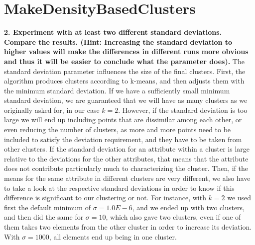 \documentclass[]{article}
\begin{document}
\section{MakeDensityBasedClusters}
\textbf{2. Experiment with at least two different standard deviations. Compare the results. (Hint: Increasing the standard deviation to higher values will make the differences in different runs more obvious and thus it will be easier to conclude what the parameter does).} 
The standard deviation parameter influences the size of the final clusters. First, the algorithm produces clusters according to k-means, and then adjusts them with the minimum standard deviation. If we have a sufficiently small minimum standard deviation, we are guaranteed that we will have as many clusters as we originally asked for, in our case $k=2$. However, if the standard deviation is too large we will end up including points that are dissimilar among each other, or even reducing the number of clusters, as more and more points need to be included to satisfy the deviation requirement, and they have to be taken from other clusters. If the standard deviation for an attribute within a cluster is large relative to the deviations for the other attributes, that means that the attribute does not contribute particularly much to characterizing the cluster. Then, if the means for the same attribute in different clusters are very different, we also have to take a look at the respective standard deviations in order to know if this difference is significant to our clustering or not. For instance, with $k=2$ we used first the default minimum of $\sigma=1.0E-6$, and we ended up with two clusters, and then did the same for $\sigma=10$, which also gave two clusters, even if one of them takes two elements from the other cluster in order to increase its deviation. With $\sigma=1000$, all elements end up being in one cluster.
\end{document}
